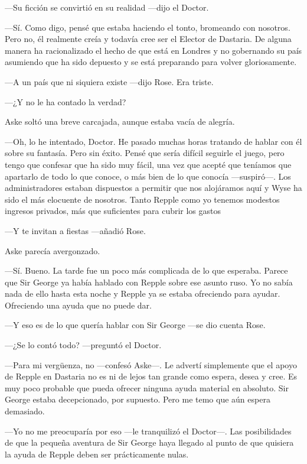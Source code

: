 {---Su ficción se convirtió en su realidad ---dijo el Doctor.}

{---Sí. Como digo, pensé que estaba haciendo el tonto, bromeando con
	nosotros. Pero no, él realmente creía y todavía cree ser el Elector de
	Dastaria. De alguna manera ha racionalizado el hecho de que está en
	Londres y no gobernando su país asumiendo que ha sido depuesto y se está
preparando para volver gloriosamente.}

{---A un país que ni siquiera existe ---dijo Rose. Era triste.}

{---¿Y no le ha contado la verdad?}

{Aske soltó una breve carcajada, aunque estaba vacía de alegría.}

{---Oh, lo he intentado, Doctor. He pasado muchas horas tratando de
	hablar con él sobre su fantasía. Pero sin éxito. Pensé que sería difícil
	seguirle el juego, pero tengo que confesar que ha sido muy fácil, una
	vez que acepté que teníamos que apartarlo de todo lo que conoce, o más
	bien de lo que conocía ---suspiró---. Los administradores estaban
	dispuestos a permitir que nos alojáramos aquí y Wyse ha sido el más
	elocuente de nosotros. Tanto Repple como yo tenemos modestos ingresos
privados, más que suficientes para cubrir los gastos}

{---Y te invitan a fiestas ---añadió Rose.}

{Aske parecía avergonzado.}

{---Sí. Bueno. La tarde fue un poco más complicada de lo que esperaba.
	Parece que Sir George ya había hablado con Repple sobre ese asunto ruso.
	Yo no sabía nada de ello hasta esta noche y Repple ya se estaba
ofreciendo para ayudar. Ofreciendo una ayuda que no puede dar.}

{---Y eso es de lo que quería hablar con Sir George ---se dio cuenta
Rose.}

{---¿Se lo contó todo? ---preguntó el Doctor.}

{---Para mi vergüenza, no ---confesó Aske---. Le advertí simplemente que
	el apoyo de Repple en Dastaria no es ni de lejos tan grande como espera,
	desea y cree. Es muy poco probable que pueda ofrecer ninguna ayuda
	material en absoluto. Sir George estaba decepcionado, por supuesto. Pero
me temo que aún espera demasiado.}

{---Yo no me preocuparía por eso ---le tranquilizó el Doctor---. Las
	posibilidades de que la pequeña aventura de Sir George haya llegado al
punto de que quisiera la ayuda de Repple deben ser prácticamente nulas.}

